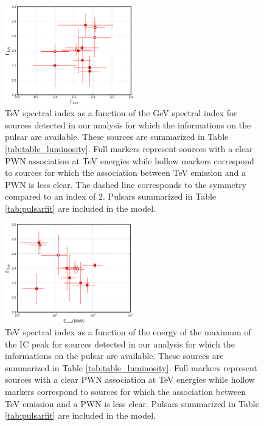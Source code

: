 \begin{figure}[h!]
\centering
\includegraphics[width=0.5\textwidth]{figures/Gamma_GeV_Gamma_TeV.eps}
\caption{TeV spectral index as a function of the GeV spectral index for sources detected in our analysis for which the informations on the pulsar are available. These sources are summarized in Table \ref{tab:table_luminosity}. Full markers represent sources with a clear PWN association at TeV energies while hollow markers correspond to sources for which the association between TeV emission and a PWN is less clear. The dashed line corresponds to the symmetry compared to an index of 2. Pulsars summarized in Table \ref{tab:pulsarfit} are included in the model.
\label{fig:gammagamma}}
\end{figure}

\begin{figure}[h!]
\centering
\includegraphics[width=0.5\textwidth]{figures/E_cut_vs_TeV.eps}
\caption{TeV spectral index as a function of the energy of the maximum of the IC peak for sources detected in our analysis for which the informations on the pulsar are available. These sources are summarized in Table \ref{tab:table_luminosity}. Full markers represent sources with a clear PWN association at TeV energies while hollow markers correspond to sources for which the association between TeV emission and a PWN is less clear. Pulsars summarized in Table \ref{tab:pulsarfit} are included in the model.
\label{fig:EpeakETeV}}
\end{figure}

